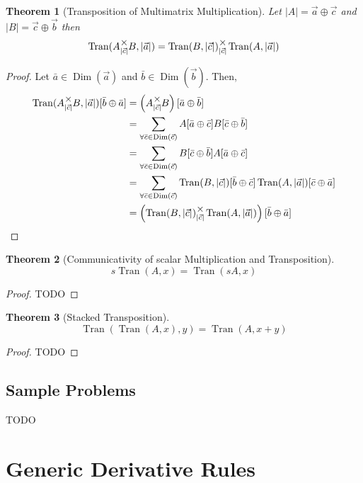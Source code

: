 \documentclass[12pt]{article}
\theoremstyle{definition}
\theoremstyle{plain}
\newtheorem{theorem}{Theorem}[section]
\theoremstyle{ppart}
\DeclareMathOperator{\Dim}{Dim}
\DeclareMathOperator{\Tran}{Tran}
\newcommand{\mmult}[1]{\text{\raisebox{1ex}{$\underset{#1}{\times}$}}}
\begin{document}
\begin{theorem}[Transposition of Multimatrix Multiplication]
\label{mm_tran_mult}
Let $|A| = \vec{a} \oplus \vec{c}$ and $|B| = \vec{c} \oplus \vec{b}$ then
\[
 \Tran(A \mmult{|\vec{c}|} B, |\vec{a}|)
 =  \Tran(B, |\vec{c}|) \mmult{|\vec{c}|} \Tran(A, |\vec{a}|)
\]
\end{theorem}
\begin{proof}
Let $\bar{a} \in \Dim(\vec{a})$ and $\bar{b} \in \Dim(\vec{b})$.
Then,
\begin{align*}
	\Tran(A \mmult{|\vec{c}|} B, |\vec{a}|)[\bar{b} \oplus \bar{a}]
	&=
	\left(A \mmult{|\vec{c}|} B \right)[\bar{a} \oplus \bar{b}] \\
	&=
	\sum_{\forall \bar{c} \in \Dim(\vec{c})}
	A[\bar{a} \oplus \bar{c}] B[\bar{c} \oplus \bar{b}] \\
	&=
	\sum_{\forall \bar{c} \in \Dim(\vec{c})}
	B[\bar{c} \oplus \bar{b}] A[\bar{a} \oplus \bar{c}] \\
	&=
	\sum_{\forall \bar{c} \in \Dim(\vec{c})}
	\Tran(B, |\vec{c}|)[\bar{b} \oplus \bar{c}]
	\Tran(A, |\vec{a}|)[\bar{c} \oplus \bar{a}] \\
	&=
	\left(\Tran(B, |\vec{c}|) \mmult{|\vec{c}|} \Tran(A, |\vec{a}|) \right)
	[\bar{b} \oplus \bar{a}]
\end{align*}
\end{proof}

\begin{theorem}[Communicativity of scalar Multiplication and Transposition]
\[ s\Tran(A, x) = \Tran(sA, x) \]
\end{theorem}
\begin{proof}
TODO
\end{proof}

\begin{theorem}[Stacked Transposition]
\[ \Tran(\Tran(A, x), y) = \Tran(A, x+y) \]
\end{theorem}
\begin{proof}
TODO
\end{proof}

\subsection*{Sample Problems}
TODO

\section{Generic Derivative Rules}
\end{document}
